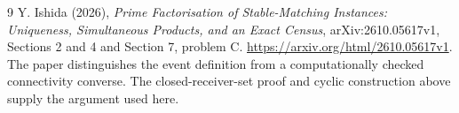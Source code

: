 \documentclass[11pt,a4paper]{article}
\begin{document}
\begin{thebibliography}{9}
 Y. Ishida (2026), \emph{Prime Factorisation of Stable-Matching Instances: Uniqueness, Simultaneous Products, and an Exact Census}, arXiv:2610.05617v1, Sections 2 and 4 and Section 7, problem C. \url{https://arxiv.org/html/2610.05617v1}. The paper distinguishes the event definition from a computationally checked connectivity converse. The closed-receiver-set proof and cyclic construction above supply the argument used here.
\end{thebibliography}
\end{document}
